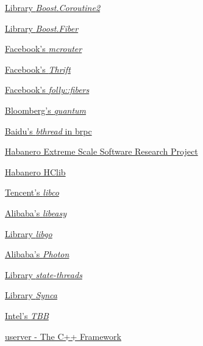 \begin{thebibliography}{99}
        \href{http://www.boost.org/doc/libs/release/libs/coroutine2/doc/html/index.html}
        {Library \emph{Boost.Coroutine2}}

        \href{http://www.boost.org/doc/libs/release/libs/fiber/doc/html/index.html}
        {Library \emph{Boost.Fiber}}

        \href{https://code.facebook.com/posts/296442737213493/introducing-mcrouter-a-memcached-protocol-router-for-scaling-memcached-deployments}
        {Facebook's \emph{mcrouter}}

        \href{https://github.com/facebook/fbthrift}
        {Facebook's \emph{Thrift}}

        \href{https://github.com/facebook/folly/tree/master/folly/fibers}
        {Facebook's \emph{folly::fibers}}

        \href{https://github.com/bloomberg/quantum}
        {Bloomberg's \emph{quantum}}

        \href{https://brpc.apache.org/docs/bthread/}
        {Baidu's \emph{bthread} in brpc}

        \href{https://wiki.rice.edu/confluence/display/HABANERO/Habanero+Extreme+Scale+Software+Research+Project}
        {Habanero Extreme Scale Software Research Project}

        \href{https://github.com/habanero-rice/hclib}
        {Habanero HClib}

        \href{https://github.com/Tencent/libco}
        {Tencent's \emph{libco}}

        \href{https://github.com/oceanbase/oceanbase/tree/develop/deps/easy}
        {Alibaba's \emph{libeasy}}

        \href{https://github.com/yyzybb537/libgo}
        {Library \emph{libgo}}

        \href{https://github.com/alibaba/PhotonLibOS}
        {Alibaba's \emph{Photon}}

        \href{https://github.com/ossrs/state-threads}
        {Library \emph{state-threads}}

        \href{https://github.com/gridem/Synca}
        {Library \emph{Synca}}

        \href{https://github.com/intel/tbb}
        {Intel's \emph{TBB}}

        \href{https://github.com/userver-framework}
        {userver - The C++ Framework}

\end{thebibliography}
